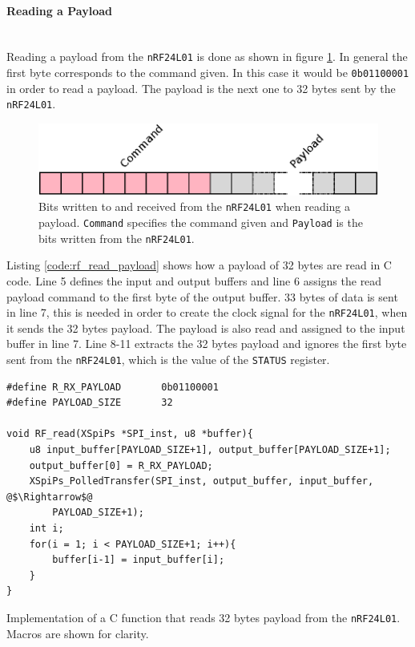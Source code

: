 \paragraph{Reading a Payload} %
\label{par:reading_a_payload}
~\\
Reading a payload from the \texttt{nRF24L01} is done as shown in figure \ref{fig:rxtx_payload}.
In general the first byte corresponds to the command given. 
In this case it would be \texttt{0b01100001} in order to read a payload.
The payload is the next one to 32 bytes sent by the \texttt{nRF24L01}.
\begin{figure}[h]
	\centering
	\includegraphics[width=.6\linewidth]{graphics/rxtx_payload.eps}
	\caption[Reading a payload on the nRF24L01.]{Bits written to and received from the \texttt{nRF24L01} when reading a payload. \texttt{Command} specifies the command given and \texttt{Payload} is the bits written from the \texttt{nRF24L01}.}
	\label{fig:rxtx_payload}
\end{figure}

Listing \ref{code:rf_read_payload} shows how a payload of 32 bytes are read in C code. 
Line 5 defines the input and output buffers and line 6 assigns the read payload command to the first byte of the output buffer.
33 bytes of data is sent in line 7, this is needed in order to create the clock signal for the \texttt{nRF24L01}, when it sends the 32 bytes payload.
The payload is also read and assigned to the input buffer in line 7.
Line 8-11 extracts the 32 bytes payload and ignores the first byte sent from the \texttt{nRF24L01}, which is the value of the \texttt{STATUS} register.

\begin{listing}[!h]
\begin{verbatim}
#define R_RX_PAYLOAD       0b01100001
#define PAYLOAD_SIZE       32

void RF_read(XSpiPs *SPI_inst, u8 *buffer){
	u8 input_buffer[PAYLOAD_SIZE+1], output_buffer[PAYLOAD_SIZE+1];
	output_buffer[0] = R_RX_PAYLOAD;
	XSpiPs_PolledTransfer(SPI_inst, output_buffer, input_buffer, @$\Rightarrow$@
		PAYLOAD_SIZE+1);
	int i;
	for(i = 1; i < PAYLOAD_SIZE+1; i++){
		buffer[i-1] = input_buffer[i];
	}
}
\end{verbatim}
\caption{Implementation of a C function that reads 32 bytes payload from the \texttt{nRF24L01}. Macros are shown for clarity.}
\label{code:rf_read_payload}
\end{listing}

